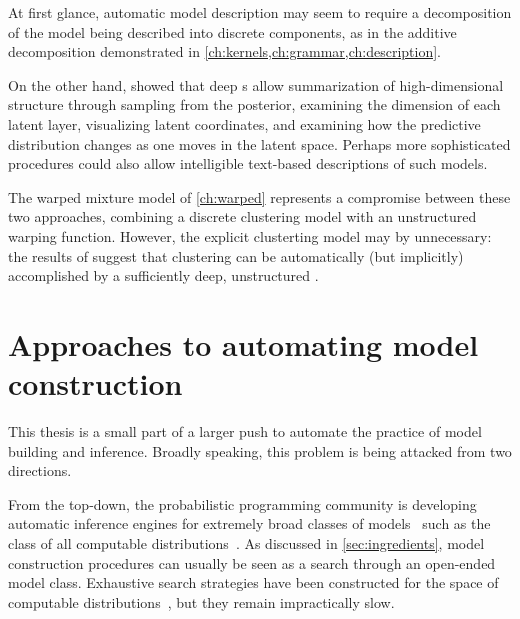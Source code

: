 \begin{itemize}
At first glance, automatic model description may seem to require a decomposition of the model being described into discrete components, as in the additive decomposition demonstrated in \cref{ch:kernels,ch:grammar,ch:description}.

On the other hand, \citet{damianou2012deep} showed that deep \gp{}s allow summarization of high-dimensional structure through sampling from the posterior, examining the dimension of each latent layer, visualizing latent coordinates, and examining how the predictive distribution changes as one moves in the latent space.
Perhaps more sophisticated procedures could also allow intelligible text-based descriptions of such models.

\end{itemize}

The warped mixture model of \cref{ch:warped} represents a compromise between these two approaches, combining a discrete clustering model with an unstructured warping function.
However, the explicit clusterting model may by unnecessary: the results of \citet{damianou2012deep} suggest that clustering can be automatically (but implicitly) accomplished by a sufficiently deep, unstructured \gp{}.




\section{Approaches to automating model construction}

This thesis is a small part of a larger push to automate the practice of model building and inference.
Broadly speaking, this problem is being attacked from two directions.

From the top-down, the probabilistic programming community is developing automatic inference engines for extremely broad classes of models~\citep{goodman2008church,mansinghka2014venture,Wood-AISTATS-2014,koller1997effective,milch20071,stan-software:2014} such as the class of all computable distributions~\citep{solomonoff1964formal, li2009introduction}.
As discussed in \cref{sec:ingredients}, model construction procedures can usually be seen as a search through an open-ended model class.
Exhaustive search strategies have been constructed for the space of computable distributions~\citep{hutter2002fastest,schmidhuber2002speed,levin1973universal}, but they remain impractically slow.

